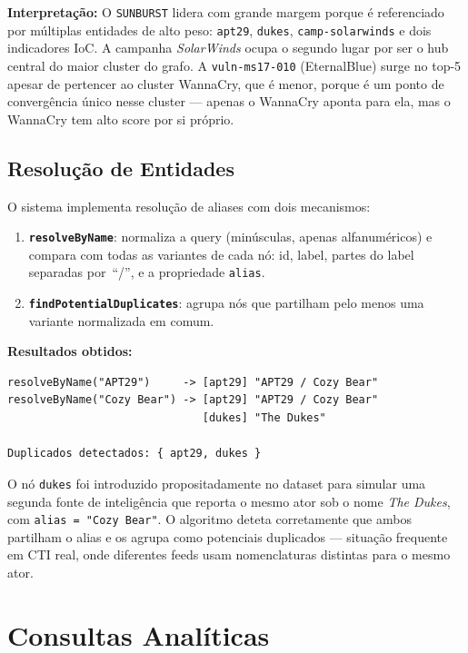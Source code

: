 \documentclass[12pt,a4paper]{article}
\begin{document}
\medskip
\noindent\textbf{Interpretação:} O \texttt{SUNBURST} lidera com grande margem porque é referenciado por múltiplas entidades de alto peso: \texttt{apt29}, \texttt{dukes}, \texttt{camp-solarwinds} e dois indicadores IoC. A campanha \emph{SolarWinds} ocupa o segundo lugar por ser o hub central do maior cluster do grafo. A \texttt{vuln-ms17-010} (EternalBlue) surge no top-5 apesar de pertencer ao cluster WannaCry, que é menor, porque é um ponto de convergência único nesse cluster — apenas o WannaCry aponta para ela, mas o WannaCry tem alto score por si próprio.

\subsection{Resolução de Entidades}

O sistema implementa resolução de aliases com dois mecanismos:

\begin{enumerate}
  \item \textbf{\texttt{resolveByName}}: normaliza a query (minúsculas, apenas alfanuméricos) e compara com todas as variantes de cada nó: id, label, partes do label separadas por~``/'', e a propriedade \texttt{alias}.

  \item \textbf{\texttt{findPotentialDuplicates}}: agrupa nós que partilham pelo menos uma variante normalizada em comum.
\end{enumerate}

\medskip
\noindent\textbf{Resultados obtidos:}

\begin{lstlisting}
resolveByName("APT29")     -> [apt29] "APT29 / Cozy Bear"
resolveByName("Cozy Bear") -> [apt29] "APT29 / Cozy Bear"
                              [dukes] "The Dukes"

Duplicados detectados: { apt29, dukes }
\end{lstlisting}

O nó \texttt{dukes} foi introduzido propositadamente no dataset para simular uma segunda fonte de inteligência que reporta o mesmo ator sob o nome \emph{The Dukes}, com \texttt{alias = "Cozy Bear"}. O algoritmo deteta corretamente que ambos partilham o alias e os agrupa como potenciais duplicados — situação frequente em CTI real, onde diferentes feeds usam nomenclaturas distintas para o mesmo ator.

\section{Consultas Analíticas}
\end{document}
